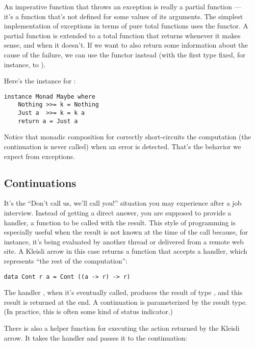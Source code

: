 An imperative function that throws an exception is really a partial
function --- it's a function that's not defined for some values of its
arguments. The simplest implementation of exceptions in terms of pure
total functions uses the  functor. A partial function is
extended to a total function that returns  whenever it
makes sense, and  when it doesn't. If we want to also
return some information about the cause of the failure, we can use the
 functor instead (with the first type fixed, for
instance, to ).

Here's the  instance for :

\begin{verbatim}
instance Monad Maybe where
    Nothing >>= k = Nothing
    Just a  >>= k = k a
    return a = Just a
\end{verbatim}
Notice that monadic composition for  correctly
short-circuits the computation (the continuation  is never
called) when an error is detected. That's the behavior we expect from
exceptions.

\subsection{Continuations}\label{continuations}

It's the ``Don't call us, we'll call you!'' situation you may experience
after a job interview. Instead of getting a direct answer, you are
supposed to provide a handler, a function to be called with the result.
This style of programming is especially useful when the result is not
known at the time of the call because, for instance, it's being
evaluated by another thread or delivered from a remote web site. A
Kleisli arrow in this case returns a function that accepts a handler,
which represents ``the rest of the computation'':

\begin{verbatim}
data Cont r a = Cont ((a -> r) -> r)
\end{verbatim}
The handler , when it's eventually called,
produces the result of type , and this result is returned at
the end. A continuation is parameterized by the result type. (In
practice, this is often some kind of status indicator.)

There is also a helper function for executing the action returned by the
Kleisli arrow. It takes the handler and passes it to the continuation:


